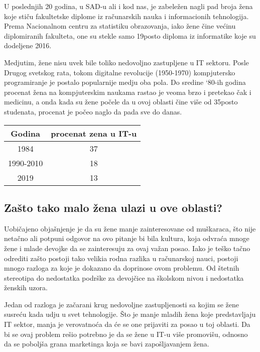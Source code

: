 \documentclass[a4paper,12pt]{article}
\begin{document}
U poslednjih 20 godina, u SAD-u ali i kod nas, je zabeležen nagli pad broja žena koje stiču fakultetske diplome iz računarskih nauka i
informacionih tehnologija. Prema Nacionalnom centru za statistiku obrazovanja, iako žene čine većinu diplomiranih fakulteta, 
one su stekle samo 19posto diploma iz informatike koje su dodeljene 2016.

Medjutim, žene nisu uvek bile toliko nedovoljno zastupljene u IT sektoru. Posle Drugog svetskog rata, 
tokom digitalne revolucije (1950-1970) kompjutersko programiranje je postalo popularnije medju oba pola. 
Do sredine `80-ih godina procenat žena na kompjuterskim naukama rastao je veoma brzo i pretekao čak i medicinu, 
a onda kada su žene počele da u ovoj oblasti čine više od 35posto studenata, procenat je počeo naglo da pada sve do danas. 

\begin{table}[h]
\centering
\begin{tabular}{c|c}
\toprule
Godina    & procenat zena u IT-u \\ 
\midrule
1984      & 37                   \\ 
1990-2010 & 18                   \\ 
2019      & 13                   \\ 
\bottomrule
\end{tabular}
\end{table}



\subsection{Zašto tako malo žena ulazi u ove oblasti? }
Uobičajeno objašnjenje je da su žene manje zainteresovane od muškaraca, 
što nije netačno ali potpuni odgovor na ovo pitanje bi bila kultura, 
koja odvraća mnoge žene i mlade devojke da se zainteresuju za ovaj važan posao.
Iako je teško tačno odrediti zašto postoji tako velikia rodna razlika u računarskoj nauci, 
postoji mnogo razloga za koje je dokazano da doprinose ovom problemu. 
Od štetnih stereotipa do nedostatka podrške za devojčice na školskom nivou i nedostatka ženskih uzora.

Jedan od razloga je začarani krug nedovoljne zastupljenosti sa kojim se žene susreću kada udju u svet tehnologije. 
Što je manje mladih žena koje predstavljaju IT sektor, manja je verovatnoća da će se one prijaviti za posao u toj oblasti. 
Da bi se ovaj problem rešio potrebno je da se žene u IT-u više promovišu, 
odnosno da se poboljša grana marketinga koja se bavi zapošljavanjem žena.
\end{document}

